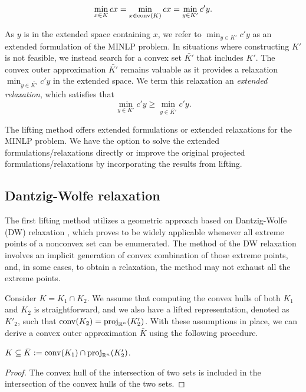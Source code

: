 \begin{equation}
    \min_{x \in K} cx  = \min_{x \in \operatorname{conv}(K)} cx = \min_{y \in K'} c'y.
\end{equation}

As $y$ is in the extended space containing $x$, we refer to $\min_{y \in K'} c'y$ as an extended formulation of the MINLP problem. In situations where constructing $K'$ is not feasible, we instead search for a convex set $\bar{K'}$ that includes $K'$. The convex outer approximation $\bar{K'}$ remains valuable as it provides a relaxation $\min_{y \in \bar{K'}} c'y$ in the extended space. We term this relaxation an \emph{extended relaxation}, which satisfies that
\begin{equation}
    \min_{y \in K'} c'y \ge \min_{y \in \bar{K'}} c'y.
\end{equation}

The lifting method offers extended formulations or extended relaxations for the MINLP problem. We have the option to solve the extended formulations/relaxations directly or improve the original projected formulations/relaxations by incorporating the results from lifting.



\subsection{Dantzig-Wolfe relaxation}
\label{chap.sec.dwrel}
The first lifting method utilizes a geometric approach based on Dantzig-Wolfe (DW) relaxation \cite{gilmore1961linear,Vanderbeck2010}, which proves to be widely applicable whenever all extreme points of a nonconvex set can be enumerated. The method of the DW relaxation involves an implicit generation of convex combination of those extreme points, and, in some cases, to obtain a relaxation, the method may not exhaust all the extreme points.

Consider $K = K_1 \cap K_2$. We assume that computing the convex hulls of both $K_1$ and $K_2$ is straightforward, and we also have a lifted representation, denoted as $K'_2$, such that $\operatorname{conv}(K_2) = \operatorname{proj}_{\mathbb R^n}(K'_2)$. With these assumptions in place, we can derive a convex outer approximation $\bar{K}$ using the following procedure.

\begin{lemma}
\label{lem.dw}
    $K \subseteq \bar{K} :=\operatorname{conv}(K_1) \cap  \operatorname{proj}_{\mathbb R^n}(K'_2)$.
\end{lemma}
\begin{proof}
    The convex hull of the intersection of two sets is included in the intersection of the convex hulls of the two sets.
\end{proof}


